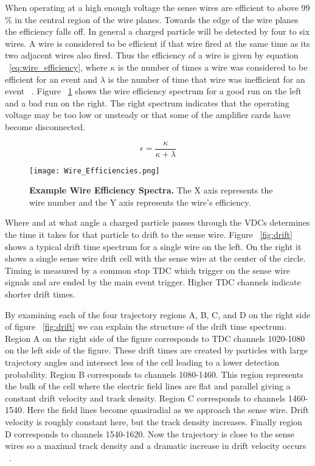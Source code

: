 When operating at a high enough voltage the sense wires are efficient to above 99$\%$ in the central region of the wire planes. Towards the edge of the wire planes the efficiency falls off. In general a charged particle will be detected by four to six wires. A wire is considered to be efficient if that wire fired at the same time as its two adjacent wires also fired. Thus the efficiency of a wire is given by equation ~\ref{eq:wire_efficiency}, where $\kappa$ is the number of times a wire was considered to be efficient for an event and $\lambda$ is the number of time that wire was inefficient for an event ~\cite{Article:VDCs}. Figure ~\ref{fig:vdc_efficiency} shows the wire efficiency spectrum for a good run on the left and a bad run on the right. The right spectrum indicates that the operating voltage may be too low or unsteady or that some of the amplifier cards have become disconnected.

\begin{equation} \label{eq:wire_efficiency}
	\epsilon = \frac{\kappa}{\kappa + \lambda}
\end{equation}

\begin{figure}[!ht]
\begin{center}
\texttt{[image: Wire\_Efficiencies.png]}
\end{center}
\caption{
{\bf{Example Wire Efficiency Spectra.}} The X axis represents the wire number and the Y axis represents the wire's efficiency.}
\label{fig:vdc_efficiency}
\end{figure}

Where and at what angle a charged particle passes through the VDCs determines the time it takes for that particle to drift to the sense wire. Figure ~\ref{fig:drift} shows a typical drift time spectrum for a single wire on the left. On the right it shows a single sense wire drift cell with the sense wire at the center of the circle. Timing is measured by a common stop TDC which trigger on the sense wire signals and are ended by the main event trigger. Higher TDC channels indicate shorter drift times.

By examining each of the four trajectory regions A, B, C, and D on the right side of figure ~\ref{fig:drift} we can explain the structure of the drift time spectrum. Region A on the right side of the figure corresponds to TDC channels 1020-1080 on the left side of the figure. These drift times are created by particles with large trajectory angles and intersect less of the cell leading to a lower detection probability. Region B corresponds to channels 1080-1460. This region represents the bulk of the cell where the electric field lines are flat and parallel giving a constant drift velocity and track density. Region C corresponds to channels 1460-1540. Here the field lines become quasiradial as we approach the sense wire. Drift velocity is roughly constant here, but the track density increases. Finally region D corresponds to channels 1540-1620. Now the trajectory is close to the sense wires so a maximal track density and a dramatic increase in drift velocity occurs ~\cite{Article:VDCs}.

